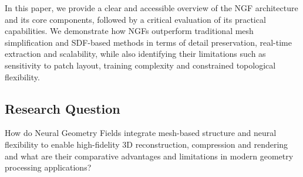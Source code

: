 In this paper, we provide a clear and accessible overview of the NGF architecture and its core components, followed by a critical evaluation of its practical capabilities.  
We demonstrate how NGFs outperform traditional mesh simplification and SDF-based methods in terms of detail preservation, real-time extraction and scalability, while also identifying their limitations such as sensitivity to patch layout, training complexity and constrained topological flexibility.  

\subsection{Research Question}  
How do Neural Geometry Fields integrate mesh-based structure and neural flexibility to enable high-fidelity 3D reconstruction, compression and rendering and what are their comparative advantages and limitations in modern geometry processing applications?